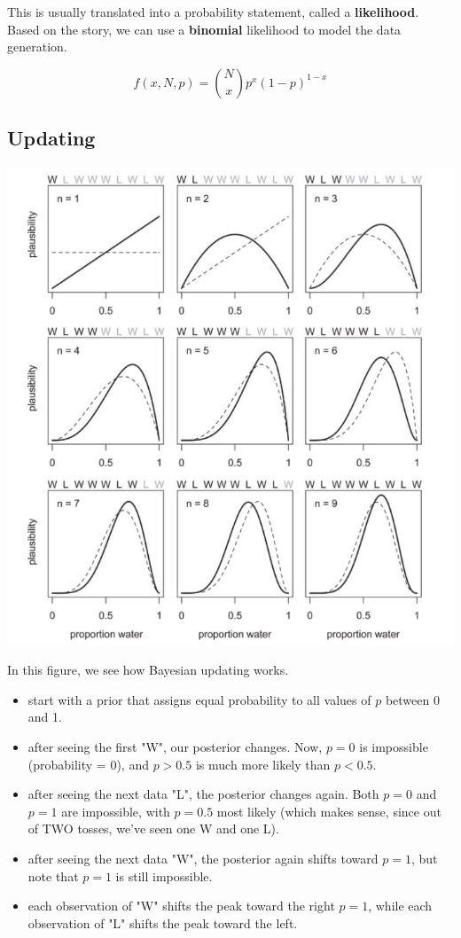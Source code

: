\documentclass[11pt]{article}
\begin{document}
This is usually translated into a probability statement, called a \textbf{likelihood}.  Based on the story, we can use a \textbf{binomial} likelihood to model the data generation.

\[
f(x,N,p) = \binom{N}{x}p^{x}(1-p)^{1-x}
\]

\subsection*{Updating}
\label{sec-5-2}

\includegraphics[width=.9\linewidth]{figures/week8/globeTossing.jpg}

In this figure, we see how Bayesian updating works.  
\begin{itemize}
\item start with a prior that assigns equal probability to all values of $p$ between 0 and 1.
\item after seeing the first "W", our posterior changes.  Now, $p=0$ is impossible (probability = 0), and $p>0.5$ is much more likely than $p<0.5$.
\item after seeing the next data "L", the posterior changes again.  Both $p=0$ and $p=1$ are impossible, with $p=0.5$ most likely (which makes sense, since out of TWO tosses, we've seen one W and one L).
\item after seeing the next data "W", the posterior again shifts toward $p=1$, but note that $p=1$ is still impossible.
\item each observation of "W" shifts the peak toward the right $p=1$, while each observation of "L" shifts the peak toward the left.
\end{itemize}
\end{document}
